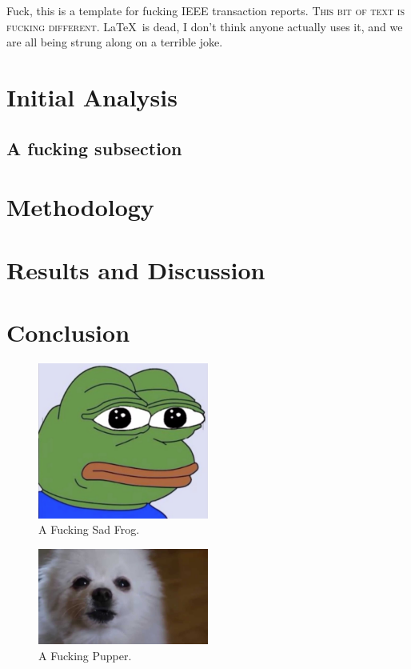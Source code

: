 \documentclass[journal,transmag]{IEEEtran}
\begin{document}
	{F}{uck}, this is a template for fucking IEEE transaction reports. \textsc{This bit of text is fucking different.} \LaTeX\ is dead, I don't think anyone actually uses it, and we are all being strung along on a terrible joke.
	
	\section{Initial Analysis}
	\lipsum[1-2]
	
	\subsection{A fucking subsection}
	
	
	\section{Methodology}
	\lipsum[3-5]
	
	\section{Results and Discussion}
	\lipsum[6-8]
	
	\section{Conclusion}
	\lipsum[9-10]
	
	\begin{figure}[!t]
		\centering
		\includegraphics[width= 0.5\textwidth]{IMAGES/exampleImage}
		\caption{A Fucking Sad Frog.}
		\label{fig_frog}
	\end{figure}
	
	\begin{figure}[!t]
		\centering
		\includegraphics[width= 0.5\textwidth]{IMAGES/fig2}
		\caption{A Fucking Pupper.}
		\label{fig_pup}
	\end{figure}
	
\end{document}
